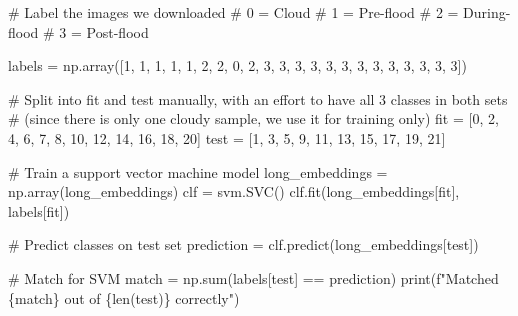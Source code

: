 \documentclass[
  letterpaper,
  DIV=11,
  numbers=noendperiod]{scrreprt}
\newenvironment{Shaded}{\begin{snugshade}}{\end{snugshade}}
\newcommand{\BuiltInTok}[1]{\textcolor[rgb]{0.00,0.23,0.31}{#1}}
\newcommand{\CommentTok}[1]{\textcolor[rgb]{0.37,0.37,0.37}{#1}}
\newcommand{\DecValTok}[1]{\textcolor[rgb]{0.68,0.00,0.00}{#1}}
\newcommand{\NormalTok}[1]{\textcolor[rgb]{0.00,0.23,0.31}{#1}}
\newcommand{\OperatorTok}[1]{\textcolor[rgb]{0.37,0.37,0.37}{#1}}
\newcommand{\SpecialCharTok}[1]{\textcolor[rgb]{0.37,0.37,0.37}{#1}}
\newcommand{\SpecialStringTok}[1]{\textcolor[rgb]{0.13,0.47,0.30}{#1}}
\begin{document}
\begin{Shaded}
\begin{Highlighting}[]
\CommentTok{\# Label the images we downloaded}
\CommentTok{\# 0 = Cloud}
\CommentTok{\# 1 = Pre{-}flood}
\CommentTok{\# 2 = During{-}flood}
\CommentTok{\# 3 = Post{-}flood}

\NormalTok{labels }\OperatorTok{=}\NormalTok{ np.array([}\DecValTok{1}\NormalTok{, }\DecValTok{1}\NormalTok{, }\DecValTok{1}\NormalTok{, }\DecValTok{1}\NormalTok{, }\DecValTok{1}\NormalTok{, }\DecValTok{2}\NormalTok{, }\DecValTok{2}\NormalTok{, }\DecValTok{0}\NormalTok{, }\DecValTok{2}\NormalTok{, }\DecValTok{3}\NormalTok{, }\DecValTok{3}\NormalTok{, }\DecValTok{3}\NormalTok{, }\DecValTok{3}\NormalTok{, }\DecValTok{3}\NormalTok{, }\DecValTok{3}\NormalTok{, }\DecValTok{3}\NormalTok{, }\DecValTok{3}\NormalTok{, }\DecValTok{3}\NormalTok{, }\DecValTok{3}\NormalTok{, }\DecValTok{3}\NormalTok{, }\DecValTok{3}\NormalTok{, }\DecValTok{3}\NormalTok{])}

\CommentTok{\# Split into fit and test manually, with an effort to have all 3 classes in both sets}
\CommentTok{\# (since there is only one cloudy sample, we use it for training only)}
\NormalTok{fit }\OperatorTok{=}\NormalTok{ [}\DecValTok{0}\NormalTok{, }\DecValTok{2}\NormalTok{, }\DecValTok{4}\NormalTok{, }\DecValTok{6}\NormalTok{, }\DecValTok{7}\NormalTok{, }\DecValTok{8}\NormalTok{, }\DecValTok{10}\NormalTok{, }\DecValTok{12}\NormalTok{, }\DecValTok{14}\NormalTok{, }\DecValTok{16}\NormalTok{, }\DecValTok{18}\NormalTok{, }\DecValTok{20}\NormalTok{]}
\NormalTok{test }\OperatorTok{=}\NormalTok{ [}\DecValTok{1}\NormalTok{, }\DecValTok{3}\NormalTok{, }\DecValTok{5}\NormalTok{, }\DecValTok{9}\NormalTok{, }\DecValTok{11}\NormalTok{, }\DecValTok{13}\NormalTok{, }\DecValTok{15}\NormalTok{, }\DecValTok{17}\NormalTok{, }\DecValTok{19}\NormalTok{, }\DecValTok{21}\NormalTok{]}

\CommentTok{\# Train a support vector machine model}
\NormalTok{long\_embeddings }\OperatorTok{=}\NormalTok{ np.array(long\_embeddings)}
\NormalTok{clf }\OperatorTok{=}\NormalTok{ svm.SVC()}
\NormalTok{clf.fit(long\_embeddings[fit], labels[fit])}

\CommentTok{\# Predict classes on test set}
\NormalTok{prediction }\OperatorTok{=}\NormalTok{ clf.predict(long\_embeddings[test])}

\CommentTok{\# Match for SVM}
\NormalTok{match }\OperatorTok{=}\NormalTok{ np.}\BuiltInTok{sum}\NormalTok{(labels[test] }\OperatorTok{==}\NormalTok{ prediction)}
\BuiltInTok{print}\NormalTok{(}\SpecialStringTok{f"Matched }\SpecialCharTok{\{}\NormalTok{match}\SpecialCharTok{\}}\SpecialStringTok{ out of }\SpecialCharTok{\{}\BuiltInTok{len}\NormalTok{(test)}\SpecialCharTok{\}}\SpecialStringTok{ correctly"}\NormalTok{)}
\end{Highlighting}
\end{Shaded}
\end{document}
